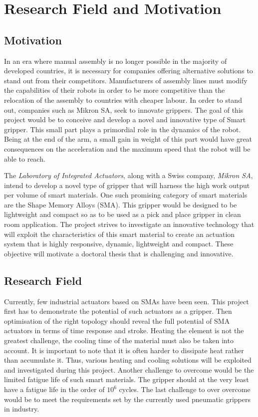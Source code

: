 \section{Research Field and Motivation}\label{sec:research_mot}
\subsection{Motivation}\label{subsec:motivation}
In an era where manual assembly is no longer possible in the majority of developed countries, it is necessary for companies offering alternative solutions to stand out from their competitors. Manufacturers of assembly lines must modify the capabilities of their robots in order to be more competitive than the relocation of the assembly to countries with cheaper labour. In order to stand out, companies such as Mikron SA, seek to innovate grippers. The goal of this project would be to conceive and develop a novel and innovative type of Smart gripper. This small part plays a primordial role in the dynamics of the robot. Being at the end of the arm, a small gain in weight of this part would have great consequences on the acceleration and the maximum speed that the robot will be able to reach.

The \emph{Laboratory of Integrated Actuators}, along with a Swiss company, \emph{Mikron SA}, intend to develop a novel type of gripper that will harness the high work output per volume of smart materials. One such promising category of smart materials are the Shape Memory Alloys (SMA). This gripper would be designed to be lightweight and compact so as to be used as a pick and place gripper in clean room application. The project strives to investigate an innovative technology that will exploit the characteristics of this smart material to create an actuation system that is highly responsive, dynamic, lightweight and compact. These objective will motivate a doctoral thesis that is challenging and innovative.

\subsection{Research Field}\label{subsec:research_field}
Currently, few industrial actuators based on SMAs have been seen. This project first has to demonstrate the potential of such actuators as a gripper. Then optimisation of the right topology should reveal the full potential of SMA actuators in terms of time response and stroke. Heating the element is not the greatest challenge, the cooling time of the material must also be taken into account. It is important to note that it is often harder to dissipate heat rather than accumulate it. Thus, various heating and cooling solutions will be exploited and investigated during this project. Another challenge to overcome would be the limited fatigue life of such smart materials. The gripper should at the very least have a fatigue life in the order of $10^6$ cycles. The last challenge to over overcome would be to meet the requirements set by the currently used pneumatic grippers in industry.

